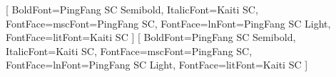 \usepackage{xeCJK}
[
  BoldFont=PingFang SC Semibold,
  ItalicFont=Kaiti SC,
  FontFace={m}{sc}{Font=PingFang SC},
  FontFace={l}{n}{Font=PingFang SC Light},
  FontFace={l}{it}{Font=Kaiti SC}
]
[
  BoldFont=PingFang SC Semibold,
  ItalicFont=Kaiti SC,
  FontFace={m}{sc}{Font=PingFang SC},
  FontFace={l}{n}{Font=PingFang SC Light},
  FontFace={l}{it}{Font=Kaiti SC}
]

\renewcommand*{\sectionstyle}[1]{\textcolor{awesome}{\sectionstyleface{#1}}}
\renewcommand{\today}{\number\year 年\number\month 月\number\day 日}

